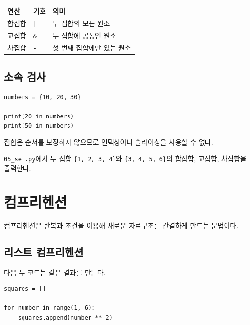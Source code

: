 \documentclass[11pt,a4paper]{article}
\begin{document}
\begin{center}
\begin{tabular}{lll}
\toprule
연산 & 기호 & 의미 \\
\midrule
합집합 & \texttt{|} & 두 집합의 모든 원소 \\
교집합 & \texttt{\&} & 두 집합에 공통인 원소 \\
차집합 & \texttt{-} & 첫 번째 집합에만 있는 원소 \\
\bottomrule
\end{tabular}
\end{center}

\subsection{소속 검사}

\begin{lstlisting}
numbers = {10, 20, 30}

print(20 in numbers)
print(50 in numbers)
\end{lstlisting}

\begin{importantbox}
집합은 순서를 보장하지 않으므로 인덱싱이나 슬라이싱을 사용할 수 없다.
\end{importantbox}

\begin{practicebox}
\texttt{05\_set.py}에서 두 집합 \texttt{\{1, 2, 3, 4\}}와 \texttt{\{3, 4, 5, 6\}}의 합집합, 교집합, 차집합을 출력한다.
\end{practicebox}

\section{컴프리헨션}

컴프리헨션은 반복과 조건을 이용해 새로운 자료구조를 간결하게 만드는 문법이다.

\subsection{리스트 컴프리헨션}

다음 두 코드는 같은 결과를 만든다.

\begin{lstlisting}
squares = []

for number in range(1, 6):
    squares.append(number ** 2)
\end{lstlisting}
\end{document}
